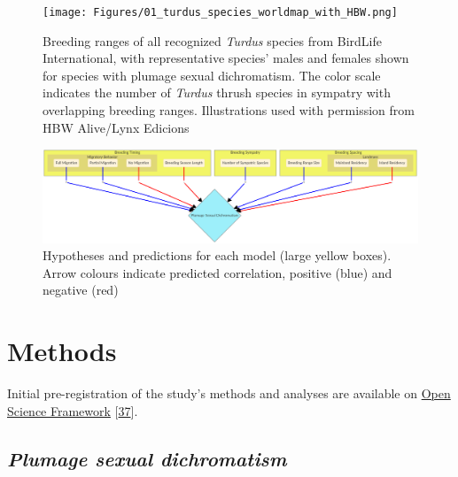 \documentclass[
  a4paper,
]{article}
\begin{document}
\begin{figure}
\hypertarget{fig:fig-01-turdus-ranges}{%
\centering
\texttt{[image: Figures/01\_turdus\_species\_worldmap\_with\_HBW.png]}
\caption{Breeding ranges of all recognized \emph{Turdus} species from
BirdLife International, with representative species' males and females
shown for species with plumage sexual dichromatism. The color scale
indicates the number of \emph{Turdus} thrush species in sympatry with
overlapping breeding ranges. Illustrations used with permission from HBW
Alive/Lynx Edicions}\label{fig:fig-01-turdus-ranges}
}
\end{figure}

\begin{figure}
\hypertarget{fig:fig:02-hypotheses}{%
\centering
\includegraphics{Figures/hypothesis-figure-mermaid.png}
\caption{Hypotheses and predictions for each model (large yellow boxes).
Arrow colours indicate predicted correlation, positive (blue) and
negative (red)}\label{fig:fig:02-hypotheses}
}
\end{figure}

\hypertarget{methods}{%
\section{Methods}\label{methods}}

Initial pre-registration of the study's methods and analyses are
available on \href{https://osf.io/zum6d}{Open Science Framework}
{[}\protect\hyperlink{ref-luro2019}{37}{]}.

\hypertarget{plumage-sexual-dichromatism}{%
\subsection{\texorpdfstring{\emph{Plumage sexual
dichromatism}}{Plumage sexual dichromatism}}\label{plumage-sexual-dichromatism}}
\end{document}
